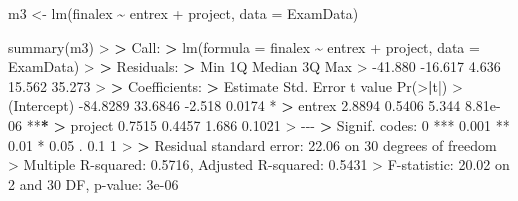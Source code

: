 \documentclass[
]{book}
\newenvironment{Shaded}{\begin{snugshade}}{\end{snugshade}}
\newcommand{\AttributeTok}[1]{\textcolor[rgb]{0.77,0.63,0.00}{#1}}
\newcommand{\DecValTok}[1]{\textcolor[rgb]{0.00,0.00,0.81}{#1}}
\newcommand{\ErrorTok}[1]{\textcolor[rgb]{0.64,0.00,0.00}{\textbf{#1}}}
\newcommand{\FloatTok}[1]{\textcolor[rgb]{0.00,0.00,0.81}{#1}}
\newcommand{\FunctionTok}[1]{\textcolor[rgb]{0.00,0.00,0.00}{#1}}
\newcommand{\NormalTok}[1]{#1}
\newcommand{\OtherTok}[1]{\textcolor[rgb]{0.56,0.35,0.01}{#1}}
\newcommand{\SpecialCharTok}[1]{\textcolor[rgb]{0.00,0.00,0.00}{#1}}
\newcommand{\StringTok}[1]{\textcolor[rgb]{0.31,0.60,0.02}{#1}}
\theoremstyle{definition}
\theoremstyle{definition}
\theoremstyle{definition}
\theoremstyle{definition}
\theoremstyle{remark}
\begin{document}
\begin{Shaded}
\begin{Highlighting}[]
\NormalTok{m3 }\OtherTok{\textless{}{-}} \FunctionTok{lm}\NormalTok{(finalex }\SpecialCharTok{\textasciitilde{}}\NormalTok{ entrex }\SpecialCharTok{+}\NormalTok{ project, }\AttributeTok{data =}\NormalTok{ ExamData)}

\FunctionTok{summary}\NormalTok{(m3)}
\SpecialCharTok{\textgreater{}} 
\ErrorTok{\textgreater{}}\NormalTok{ Call}\SpecialCharTok{:}
\ErrorTok{\textgreater{}} \FunctionTok{lm}\NormalTok{(}\AttributeTok{formula =}\NormalTok{ finalex }\SpecialCharTok{\textasciitilde{}}\NormalTok{ entrex }\SpecialCharTok{+}\NormalTok{ project, }\AttributeTok{data =}\NormalTok{ ExamData)}
\SpecialCharTok{\textgreater{}} 
\ErrorTok{\textgreater{}}\NormalTok{ Residuals}\SpecialCharTok{:}
\ErrorTok{\textgreater{}}\NormalTok{     Min      1Q  Median      3Q     Max }
\SpecialCharTok{\textgreater{}} \SpecialCharTok{{-}}\FloatTok{41.880} \SpecialCharTok{{-}}\FloatTok{16.617}   \FloatTok{4.636}  \FloatTok{15.562}  \FloatTok{35.273} 
\SpecialCharTok{\textgreater{}} 
\ErrorTok{\textgreater{}}\NormalTok{ Coefficients}\SpecialCharTok{:}
\ErrorTok{\textgreater{}}\NormalTok{             Estimate Std. Error t value }\FunctionTok{Pr}\NormalTok{(}\SpecialCharTok{\textgreater{}}\ErrorTok{|}\NormalTok{t}\SpecialCharTok{|}\NormalTok{)    }
\SpecialCharTok{\textgreater{}}\NormalTok{ (Intercept) }\SpecialCharTok{{-}}\FloatTok{84.8289}    \FloatTok{33.6846}  \SpecialCharTok{{-}}\FloatTok{2.518}   \FloatTok{0.0174} \SpecialCharTok{*}  
\ErrorTok{\textgreater{}}\NormalTok{ entrex        }\FloatTok{2.8894}     \FloatTok{0.5406}   \FloatTok{5.344} \FloatTok{8.81e{-}06} \SpecialCharTok{**}\ErrorTok{*}
\ErrorTok{\textgreater{}}\NormalTok{ project       }\FloatTok{0.7515}     \FloatTok{0.4457}   \FloatTok{1.686}   \FloatTok{0.1021}    
\SpecialCharTok{\textgreater{}} \SpecialCharTok{{-}{-}{-}}
\ErrorTok{\textgreater{}}\NormalTok{ Signif. codes}\SpecialCharTok{:}  \DecValTok{0} \StringTok{\textquotesingle{}***\textquotesingle{}} \FloatTok{0.001} \StringTok{\textquotesingle{}**\textquotesingle{}} \FloatTok{0.01} \StringTok{\textquotesingle{}*\textquotesingle{}} \FloatTok{0.05} \StringTok{\textquotesingle{}.\textquotesingle{}} \FloatTok{0.1} \StringTok{\textquotesingle{} \textquotesingle{}} \DecValTok{1}
\SpecialCharTok{\textgreater{}} 
\ErrorTok{\textgreater{}}\NormalTok{ Residual standard error}\SpecialCharTok{:} \FloatTok{22.06}\NormalTok{ on }\DecValTok{30}\NormalTok{ degrees of freedom}
\SpecialCharTok{\textgreater{}}\NormalTok{ Multiple R}\SpecialCharTok{{-}}\NormalTok{squared}\SpecialCharTok{:}  \FloatTok{0.5716}\NormalTok{,  Adjusted R}\SpecialCharTok{{-}}\NormalTok{squared}\SpecialCharTok{:}  \FloatTok{0.5431} 
\SpecialCharTok{\textgreater{}}\NormalTok{ F}\SpecialCharTok{{-}}\NormalTok{statistic}\SpecialCharTok{:} \FloatTok{20.02}\NormalTok{ on }\DecValTok{2}\NormalTok{ and }\DecValTok{30}\NormalTok{ DF,  p}\SpecialCharTok{{-}}\NormalTok{value}\SpecialCharTok{:} \FloatTok{3e{-}06}
\end{Highlighting}
\end{Shaded}
\end{document}
